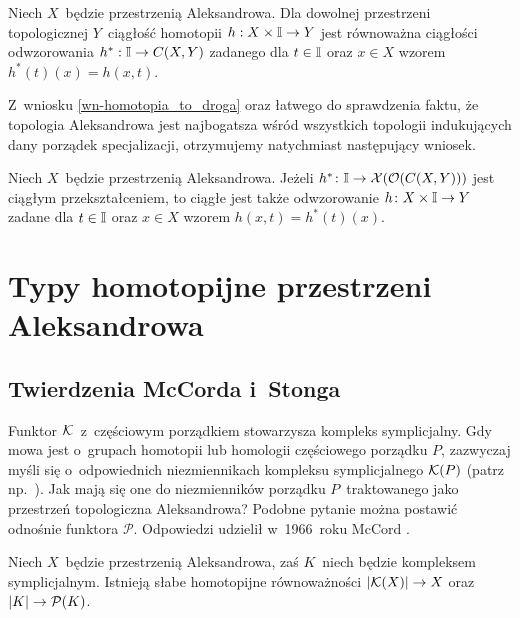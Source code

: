 \begin{wn}\label{wn-homotopia_to_droga}
Niech $X$~będzie przestrzenią Aleksandrowa. Dla dowolnej przestrzeni topologicznej $Y$~ciągłość homotopii $h:X\times \mathbb{I}\to Y$ jest równoważna ciągłości odwzorowania $h^*:\mathbb{I}\to C(X,Y)$ zadanego dla $t\in\mathbb{I}$ oraz $x\in X$ wzorem $h^*(t)(x)=h(x,t)$.
\end{wn}

Z~wniosku \ref{wn-homotopia_to_droga} oraz łatwego do sprawdzenia faktu, że topologia Aleksandrowa jest najbogatsza wśród wszystkich topologii indukujących dany porządek specjalizacji, otrzymujemy natychmiast następujący wniosek.

\begin{wn}\label{wn-droga_w_al_wyznacza_homotopie}
Niech $X$~będzie przestrzenią Aleksandrowa. Jeżeli $h^*\colon \mathbb{I}\to \mathcal{X}(\mathcal{O}(C(X,Y)))$ jest ciągłym przekształceniem, to ciągłe jest także odwzorowanie $h\colon X\times \mathbb{I}\to Y$ zadane dla $t\in \mathbb{I}$ oraz $x\in X$ wzorem $h(x,t)=h^*(t)(x)$.
\end{wn}


\section{Typy homotopijne przestrzeni Aleksandrowa}\label{sec-typy_hom_p_aleks}

\subsection{Twierdzenia McCorda i~Stonga}\label{subsec-tw_mccorda_i_stonga}
Funktor $\mathcal{K}$~z~częściowym porządkiem stowarzysza kompleks symplicjalny. Gdy mowa jest o~grupach homotopii lub homologii częściowego porządku $P$, zazwyczaj myśli się o~odpowiednich niezmiennikach kompleksu symplicjalnego $\mathcal{K}(P)$ (patrz np.~\cite{Bjorner95,Wachs07}). Jak mają się one do niezmienników porządku $P$~traktowanego jako przestrzeń topologiczna Aleksandrowa? Podobne pytanie można postawić odnośnie funktora $\mathcal{P}$. Odpowiedzi udzielił w~1966~roku McCord \cite{McCord66}.

\begin{tw}
Niech $X$~będzie przestrzenią Aleksandrowa, zaś $K$~niech będzie kompleksem symplicjalnym. Istnieją słabe homotopijne równoważności $|\mathcal{K}(X)|\to X$ oraz $|K|\to \mathcal{P}(K)$.
\end{tw}

